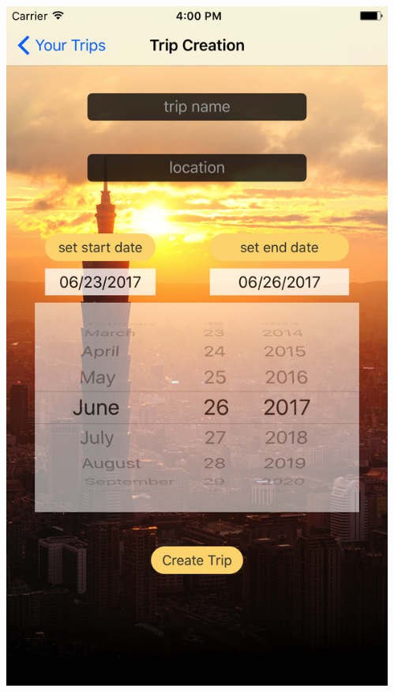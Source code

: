 \documentclass{beamer}
\begin{document}
\begin{frame}
\begin{columns}
\begin{column}{0.3\textwidth}
\begin{center}
        \end{center}
    \end{column}
    \begin{column}{0.3\textwidth}  %
        \begin{center}
            \includegraphics[scale=0.08]{tripsCreation}
        \end{center}
    \end{column}
\end{columns}
\end{frame}
\end{document}

